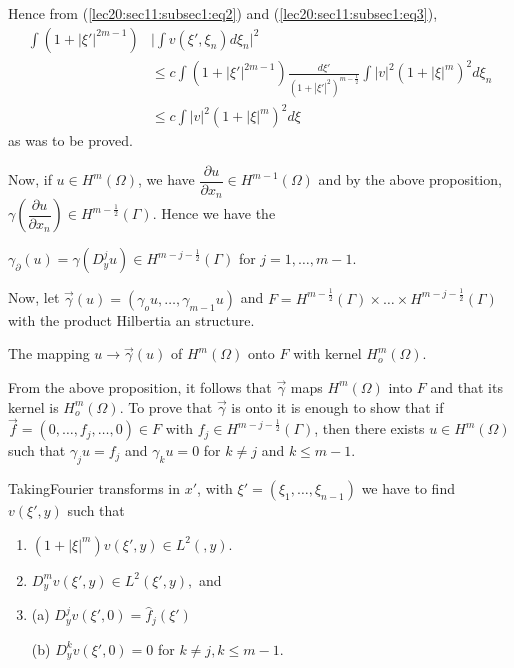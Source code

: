 Hence from (\ref{lec20:sec11:subsec1:eq2}) and (\ref{lec20:sec11:subsec1:eq3}), 
\begin{align*}
  \int (1 + |\xi' |^{2m-1}) & \Big| \int v (\xi' , \xi_n ) d \xi_n \Big
  |^2\\ 
  & \leq c \int (1 + |\xi' |^{2m - 1}) \frac{d \xi'}{(1+|\xi'|^2)^{m
      - \frac{1}{2}}} \int | v|^2 (1 + | \xi |^m)^2 d \xi_n\\ 
  & \leq c \int |v |^2 (1 + |\xi|^m)^2 d \xi 
\end{align*}
as was to be proved. 

Now, if $u \in H^m (\Omega)$, we have $\dfrac{\partial
  u}{\partial x_n} \in H^{m-1} (\Omega)$ and by the above
proposition, $\gamma \left(\dfrac{\partial u}{\partial x_n}\right) \in H^{m
  - \frac{1}{2}} (\Gamma)$. Hence we have the 
\begin{coro*} %
$\gamma_\partial (u) = \gamma (D^j_y u) \in H^{m - j -
    \frac{1}{2}}(\Gamma)$ for $j = 1, \ldots , m - 1$.  
\end{coro*}

Now, let $\overset{\to}{\gamma} (u) = (\gamma_o u, \ldots , \gamma_{m
  -1} u)$ and $F = H^{m - \frac{1}{2}} (\Gamma) \times \ldots \times H^{m - j -
  \frac{1}{2}} (\Gamma)$ with the product Hilbertia an structure.  

\begin{theorem}\label{lec20:sec11:subsec1:thm11.1} %
  The mapping $u \to \overset{\to}{\gamma} (u)$ of $H^m (\Omega)$ onto
  $F$ with kernel $H^m_o (\Omega)$.  
\end{theorem}

From the above proposition, it follows that $\overset{\to}{\gamma}$
maps $H^m (\Omega)$ into $F$ and that its kernel is $H^m_o
(\Omega)$. To prove that $\overset{\to}{\gamma}$ is onto it is enough
to show that if $\overset{\to}{f} = (0, \ldots , f_j, \ldots , 0)
\in F$ with $f_j \in H^{m - j - \frac{1}{2}}
(\Gamma)$, then there exists $u \in H^m (\Omega)$ such that
$\gamma_j u = f_j $ and $\gamma_k u = 0$ for $k \neq j$ and $k \leq m
- 1$.  

Taking\pageoriginale Fourier transforms in $x'$, with $\xi' = (\xi_1, \ldots ,
\xi_{n - 1})$ we have to find $v (\xi', y)$ such that 
\begin{enumerate}[1)]
\item $(1 + | \xi |^m) v (\xi', y) \in L^2 (, y)$. 
\item $D^m_y v(\xi' , y) \in L^2 (\xi' , y), $ and
\item (a)  $D^j_y v (\xi' , 0) = \hat{f}_j (\xi')$

  (b) $D^k_y v (\xi' , 0) = 0$ for $k \neq j, k \leq m - 1$. 
\end{enumerate}

